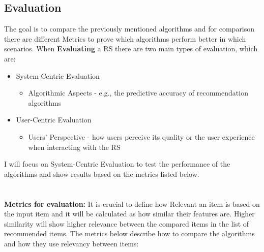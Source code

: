 \documentclass[\myFontSize,oneside,english,hidelinks,a4paper]{article}
\begin{document}
\subsection{Evaluation}
The goal is to compare the previously mentioned algorithms and for comparison there are different Metrics to prove which algorithms perform better in which scenarios. When \textbf{Evaluating} a RS there are two main types of evaluation, which are:
\begin{itemize}
\item System-Centric Evaluation
	\begin{itemize}
	\item Algorithmic Aspects - e.g., the predictive accuracy of recommendation algorithms
	\end{itemize}

\item User-Centric Evaluation
	\begin{itemize}
	\item Users' Perspective - how users perceive its quality or the user experience when interacting with the RS
	\end{itemize}
\end{itemize}
%
%
I will focus on System-Centric Evaluation to test the performance of the algorithms and show results based on the metrics listed below.\\\\\\
%
%
\textbf{Metrics for evaluation:}
It is crucial to define how Relevant an item is based on the input item and it will be calculated as how similar their features are. Higher similarity will show higher relevance between the compared items in the list of recommended items. The metrics below describe how to compare the algorithms and how they use relevancy between items:
\end{document}
